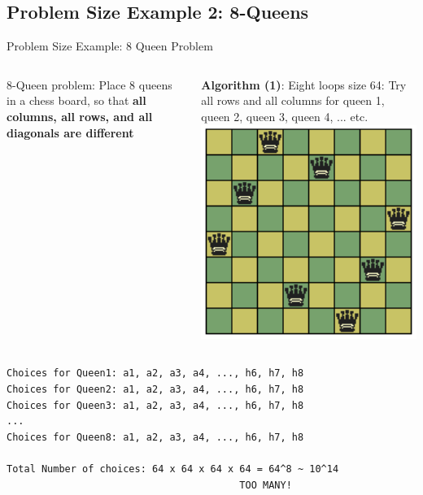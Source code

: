\subsection{Problem Size Example 2: 8-Queens}

\begin{frame}[fragile]{Problem Size Example: 8 Queen Problem}
  \begin{columns}
    8-Queen problem: Place 8 queens in a chess board, so that {\bf all columns, all rows, and all diagonals are different}\bigskip

    {\bf Algorithm (1)}: Eight loops size 64: Try all rows and all columns for queen 1, queen 2, queen 3, queen 4, ... etc.
    \includegraphics[width=1\textwidth]{img/8queen}
  \end{columns}
\begin{verbatim}
Choices for Queen1: a1, a2, a3, a4, ..., h6, h7, h8
Choices for Queen2: a1, a2, a3, a4, ..., h6, h7, h8
Choices for Queen3: a1, a2, a3, a4, ..., h6, h7, h8
...
Choices for Queen8: a1, a2, a3, a4, ..., h6, h7, h8

Total Number of choices: 64 x 64 x 64 x 64 = 64^8 ~ 10^14
                                        TOO MANY!
\end{verbatim}
\end{frame}

